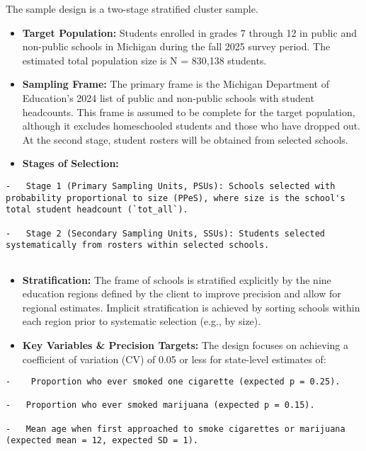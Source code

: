 \documentclass[
  12pt]{article}
\begin{document}
The sample design is a two-stage stratified cluster sample.

\begin{itemize}
\item
  \textbf{Target Population:} Students enrolled in grades 7 through 12
  in public and non-public schools in Michigan during the fall 2025
  survey period. The estimated total population size is N = 830,138
  students.
\item
  \textbf{Sampling Frame:} The primary frame is the Michigan Department
  of Education's 2024 list of public and non-public schools with student
  headcounts. This frame is assumed to be complete for the target
  population, although it excludes homeschooled students and those who
  have dropped out. At the second stage, student rosters will be
  obtained from selected schools.
\item
  \textbf{Stages of Selection:}
\end{itemize}

\begin{verbatim}
-   Stage 1 (Primary Sampling Units, PSUs): Schools selected with probability proportional to size (PPeS), where size is the school's total student headcount (`tot_all`).

-   Stage 2 (Secondary Sampling Units, SSUs): Students selected systematically from rosters within selected schools.
     
\end{verbatim}

\begin{itemize}
\item
  \textbf{Stratification:} The frame of schools is stratified explicitly
  by the nine education regions defined by the client to improve
  precision and allow for regional estimates. Implicit stratification is
  achieved by sorting schools within each region prior to systematic
  selection (e.g., by size).
\item
  \textbf{Key Variables \& Precision Targets:} The design focuses on
  achieving a coefficient of variation (CV) of 0.05 or less for
  state-level estimates of:
\end{itemize}

\begin{verbatim}
-    Proportion who ever smoked one cigarette (expected p = 0.25).

-   Proportion who ever smoked marijuana (expected p = 0.15).

-   Mean age when first approached to smoke cigarettes or marijuana (expected mean = 12, expected SD = 1).
\end{verbatim}
\end{document}
